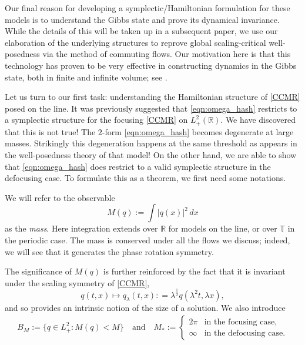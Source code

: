 \documentclass{amsart}
\numberwithin{equation}{section}
\theoremstyle{definition}
\newcommand{\R}{\mathbb{R}}
\newcommand{\T}{\mathbb{T}}
\newcommand{\qtq}[1]{\quad\text{#1}\quad}
\begin{document}
Our final reason for developing a symplectic/Hamiltonian formulation for these models is to understand the Gibbs state and prove its dynamical invariance.  While the details of this will be taken up in a subsequent paper, we use our elaboration of the underlying structures to reprove global scaling-critical well-posedness via the method of commuting flows.  Our motivation here is that this technology has proven to be very effective in constructing dynamics in the Gibbs state, both in finite and infinite volume; see \cite{KMV:white,FKV:mKdV}.

Let us turn to our first task: understanding the Hamiltonian structure of \eqref{CCMR} posed on the line.  It was previously suggested \cite[p. 4011]{gerard2024calogero} that \eqref{eqn:omega_hash} restricts to a symplectic structure for the focusing \eqref{CCMR} on $L^2_+(\R)$.  We have discovered that this is not true!  The $2$-form \eqref{eqn:omega_hash} becomes degenerate at large masses.  Strikingly this degeneration happens at the same threshold as appears in the well-posedness theory of that model!  On the other hand, we are able to show that \eqref{eqn:omega_hash} does restrict to a valid symplectic structure in the defocusing case.  To formulate this as a theorem, we first need some notations.

We will refer to the observable
\begin{equation}\label{M defn}
M(q):= \int |q(x)|^2\,dx 
\end{equation}
as the \emph{mass}.  Here integration extends over $\R$ for models on the line, or over $\T$ in the periodic case.  The mass is conserved under all the flows we discuss; indeed, we will see that it generates the phase rotation symmetry.

The significance of $M(q)$ is further reinforced by the fact that it is invariant under the scaling symmetry of \eqref{CCMR},
\begin{equation}\label{scaling}
q(t,x) \mapsto q_\lambda(t,x) : = \lambda^{\frac12} q(\lambda^2 t, \lambda x),
\end{equation}
and so provides an intrinsic notion of the size of a solution.  We also introduce
\begin{align}\label{eqn:M_ast}%
B_M := \{ q \in L^2_+ : M(q) < M\} \qtq{and} 
M_\ast:=\begin{cases} 2\pi &\text{in the focusing case,}\\ \infty &\text{in the defocusing case.} \end{cases}
\end{align}
\end{document}
